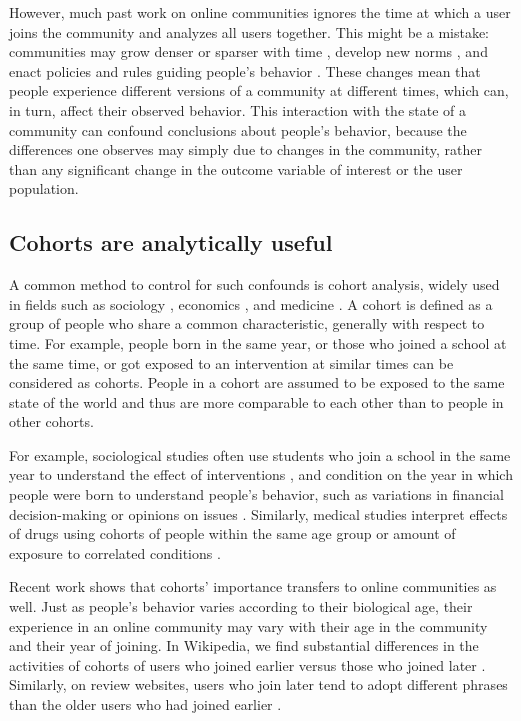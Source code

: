 However, much past work on online communities ignores the time at which a user joins the community and analyzes all users together.
This might be a mistake: communities may grow denser or sparser with time \cite{Leskovec2005}, develop new norms \cite{Kooti2010}, and enact policies and rules guiding people's behavior \cite{Butler2008}.
These changes mean that people experience different versions of a community at different times, which can, in turn, affect their observed behavior. This interaction with the state of a community can confound conclusions about people's behavior, because the differences one observes may simply due to changes in the community, rather than any significant change in the outcome variable of interest or the user population.  


\subsection{Cohorts are analytically useful}

A common method to control for such confounds is cohort analysis, widely used in fields such as sociology \cite{Mason2012,Glenn2005}, economics \cite{Attanasio1993,Beldona2005}, and medicine \cite{Howartz1996,Davis2010}. A cohort is defined as a group of people who share a common characteristic, generally with respect to time. For example, people born in the same year, or those who joined a school at the same time, or got exposed to an intervention at similar times can be considered as cohorts.  People in a cohort are assumed to be exposed to the same state of the world and thus are more comparable to each other than to people in other cohorts. 

For example, sociological studies often use students who join a school in the same year to understand the effect of interventions \cite{Goyette2008,Alexander2012}, and condition on the year in which people were born to understand people's  behavior, such as variations in financial decision-making \cite{Attanasio1993} or opinions on issues \cite{Firebaugh1988,Jennings1996}. Similarly, medical studies interpret effects of drugs using cohorts of people within the same age group or amount of exposure to correlated conditions \cite{Howartz1996,Davis2010}.  

Recent work shows that cohorts' importance transfers to online communities as well. Just as people's behavior varies according to their biological age, their experience in an online community may vary with their age in the community and their year of joining. In Wikipedia, we find substantial differences in the activities of cohorts of users who joined earlier versus those who joined later \cite{Welser2011}. Similarly, on review websites, users who join later tend to adopt different phrases than the older users who had joined earlier \cite{Danescu-niculescu-mizil2013}.

